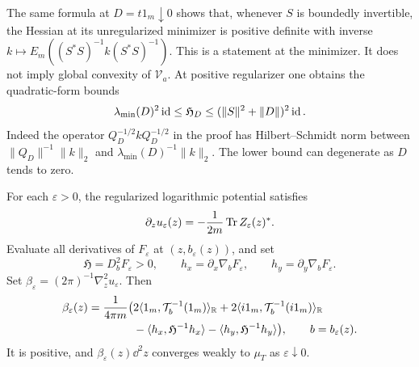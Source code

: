 The same formula at $D=t1_m\downarrow0$ shows that, whenever $S$ is boundedly invertible, the Hessian at its unregularized minimizer is positive definite with inverse $k\mapsto E_m((S^*S)^{-1}k(S^*S)^{-1})$.
This is a statement at the minimizer.
It does not imply global convexity of $\mathcal V_a$.
At positive regularizer one obtains the quadratic-form bounds
\[
 \lambda_{\min}(D)^2\operatorname{id}\le\mathfrak H_D
       \le(\|S\|^2+\|D\|)^2\operatorname{id}.
\]
Indeed the operator $Q_D^{-1/2}kQ_D^{-1/2}$ in the proof has Hilbert--Schmidt norm between $\|Q_D\|^{-1}\|k\|_2$ and $\lambda_{\min}(D)^{-1}\|k\|_2$.
The lower bound can degenerate as $D$ tends to zero.

\begin{proposition}\label{prop:brown-optimizer-density}
For each $\varepsilon>0$, the regularized logarithmic potential satisfies
\begin{equation}\label{eq:brown-envelope-transform}
 \partial_z u_\varepsilon(z)
       =-\frac1{2m}\operatorname{Tr} Z_\varepsilon(z)^*.
\end{equation}
Evaluate all derivatives of $F_\varepsilon$ at $(z,b_\varepsilon(z))$, and set
\[
 \mathfrak H=D_b^2F_\varepsilon>0,\qquad
 h_x=\partial_x\nabla_bF_\varepsilon,
 \qquad h_y=\partial_y\nabla_bF_\varepsilon.
\]
Set $\beta_\varepsilon=(2\pi)^{-1}\nabla_z^2u_\varepsilon$.
Then
\begin{equation}\label{eq:brown-hessian-density}
 \begin{split}
 \beta_\varepsilon(z)=\frac1{4\pi m}\bigl(&
  2\langle1_m,\mathcal T_b^{-1}(1_m)\rangle_{\mathbb R}
 +2\langle i1_m,\mathcal T_b^{-1}(i1_m)\rangle_{\mathbb R}\\
 &-\langle h_x,\mathfrak H^{-1}h_x\rangle
  -\langle h_y,\mathfrak H^{-1}h_y\rangle\bigr),
 \qquad b=b_\varepsilon(z).
 \end{split}
\end{equation}
It is positive, and $\beta_\varepsilon(z)\dd^2z$ converges weakly to $\mu_T$ as $\varepsilon\downarrow0$.
\end{proposition}
